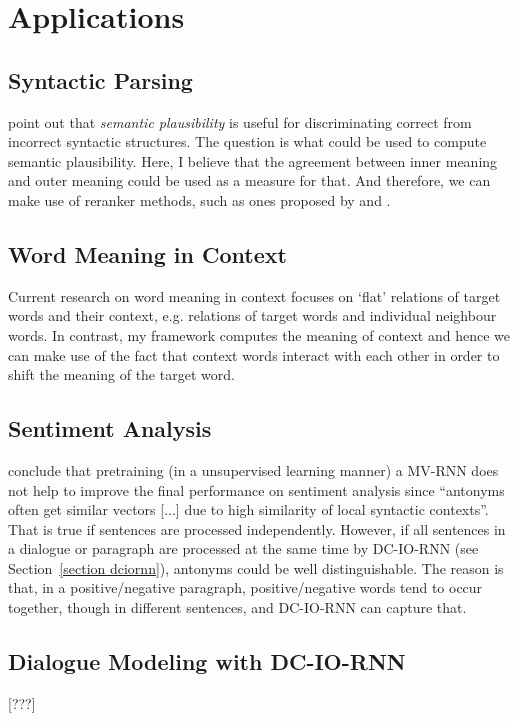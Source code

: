 \documentclass[10pt]{article}
\begin{document}
\section{Applications}
\label{section applications}

\subsection{Syntactic Parsing}
\cite{lazaridou2013fish} point out that \textit{semantic plausibility} is useful for discriminating 
correct from incorrect syntactic structures. The question is what could be used to compute 
semantic plausibility. Here, I believe that the agreement between inner meaning and outer meaning
could be used as a measure for that. And therefore, we can make use of reranker methods, 
such as ones proposed by \cite{socher2013parsing} and \cite{le2013learning}.

\subsection{Word Meaning in Context}
Current research on word meaning in context \citep{huang2012improving,
thater2011word, dinu2010measuring, erk2008structured, dinu2012comparison}
focuses on `flat' relations of  target words
and their context, e.g. relations of target words and individual neighbour words. 
In contrast, my framework computes the meaning of context and hence we can 
make use of the fact that context words interact with each other in order to shift the 
meaning of the target word.

\subsection{Sentiment Analysis}
\cite{socher2012semantic} conclude that pretraining (in a unsupervised learning manner)
a MV-RNN does not help to improve the final performance on sentiment analysis 
since ``antonyms often get similar vectors [...] due to high similarity of 
local syntactic contexts''. That is true if sentences are processed independently. 
However, if all sentences in a dialogue or paragraph are processed at the same time
by DC-IO-RNN (see Section~\ref{section dciornn}), antonyms could be well 
distinguishable. The reason is that, in a positive/negative paragraph, positive/negative words tend
to occur together, though in different sentences, and DC-IO-RNN can capture that.

\subsection{Dialogue Modeling with DC-IO-RNN}
[???]





\end{document}
